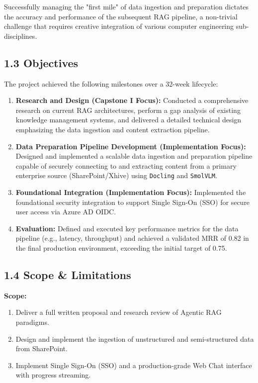 \documentclass[12pt]{article}
\begin{document}
Successfully managing the "first mile" of data ingestion and preparation dictates the accuracy and performance of the subsequent RAG pipeline, a non-trivial challenge that requires creative integration of various computer engineering sub-disciplines.

\subsection{1.3 Objectives}
The project achieved the following milestones over a 32-week lifecycle:
\begin{enumerate}
    \item \textbf{Research and Design (Capstone I Focus):} Conducted a comprehensive research on current RAG architectures, perform a gap analysis of existing knowledge management systems, and delivered a detailed technical design emphasizing the data ingestion and content extraction pipeline.
    \item \textbf{Data Preparation Pipeline Development (Implementation Focus):} Designed and implemented a scalable data ingestion and preparation pipeline capable of securely connecting to and extracting content from a primary enterprise source (SharePoint/Xhive) using \texttt{Docling} and \texttt{SmolVLM}.
    \item \textbf{Foundational Integration (Implementation Focus):} Implemented the foundational security integration to support Single Sign-On (SSO) for secure user access via Azure AD OIDC.
    \item \textbf{Evaluation:} Defined and executed key performance metrics for the data pipeline (e.g., latency, throughput) and achieved a validated MRR of 0.82 in the final production environment, exceeding the initial target of 0.75.
\end{enumerate}

\subsection{1.4 Scope \& Limitations}
\textbf{Scope:}
\begin{enumerate}
    \item Deliver a full written proposal and research review of Agentic RAG paradigms.
    \item Design and implement the ingestion of unstructured and semi-structured data from SharePoint.
    \item Implement Single Sign-On (SSO) and a production-grade Web Chat interface with progress streaming.
\end{enumerate}
\end{document}
